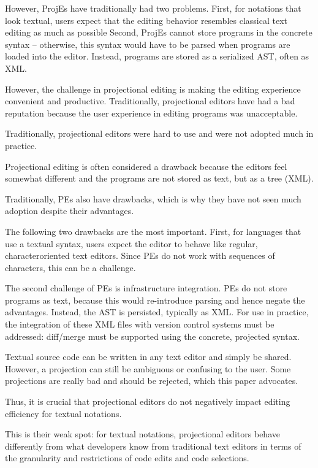 However, ProjEs have traditionally had two problems.
First, for notations that look textual, users expect that the editing behavior resembles classical text editing as much as possible 
Second, ProjEs cannot store programs in the concrete syntax – otherwise, this syntax would have to be parsed when programs are loaded into the editor.
Instead, programs are stored as a serialized AST, often as XML. 

However, the challenge in projectional editing is making the editing experience convenient and productive.
Traditionally, projectional editors have had a bad reputation because the user experience in editing programs was unacceptable.


Traditionally, projectional editors were hard to use and were not adopted much in practice.

Projectional editing is often considered a drawback because the editors feel somewhat different and the programs are not stored as text, but as a tree (XML).

Traditionally, PEs also have drawbacks, which is why they have not seen much adoption despite their advantages.

The following two drawbacks are the most important.
First, for languages that use a textual syntax, users expect the editor to behave like regular, characteroriented text editors.
Since PEs do not work with sequences of characters, this can be a challenge. 


The second challenge of PEs is infrastructure integration.
PEs do not store programs as text, because this would re-introduce parsing and hence negate the advantages.
Instead, the AST is persisted, typically as XML.
For use in practice, the integration of these XML files with version control systems must be addressed: diff/merge must be supported using the concrete, projected syntax.


Textual source code can be written in any text editor and simply be shared.
However, a projection can still be ambiguous or confusing to the user.
Some projections are really bad and should be rejected, which this paper advocates.

Thus, it is crucial that projectional editors do not negatively impact editing efficiency for textual notations.

This is their weak spot: for textual notations, projectional editors behave differently from what developers know from traditional text editors in terms of the granularity and restrictions of code edits and code selections.

